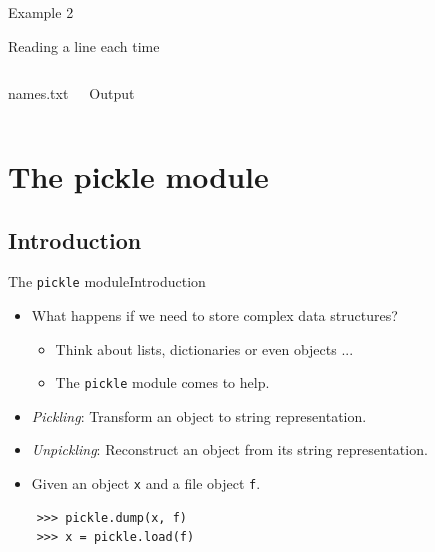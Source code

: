 \documentclass[10pt,compress]{beamer} %
\begin{document}
\begin{frame}[fragile]{Example 2}{}
	\begin{block}{Reading a line each time}
	\vspace{-0.2cm}
	
	\vspace{-0.2cm}
	\end{block}
	\begin{columns}
	\begin{block}{names.txt}
	
	\end{block}
	\begin{block}{Output}
	
	\end{block}
	\end{columns}
	
\end{frame}

\section{The pickle module}

\subsection{Introduction}
\begin{frame}[fragile]{The \texttt{pickle} module}{Introduction}
	\begin{itemize}
		\item What happens if we need to store complex data structures?
		\begin{itemize}
			\item Think about lists, dictionaries or even objects ...
			\item The \texttt{pickle} module comes to help.
		\end{itemize}
		\item \textit{Pickling}: Transform an object to string representation.
		\item \textit{Unpickling}: Reconstruct an object from its string representation.
		\item Given an object \texttt{x} and a file object \texttt{f}.
	\end{itemize}
	\begin{verbatim}
	>>> pickle.dump(x, f)
	>>> x = pickle.load(f)
	\end{verbatim}
\end{frame}
\end{document}
